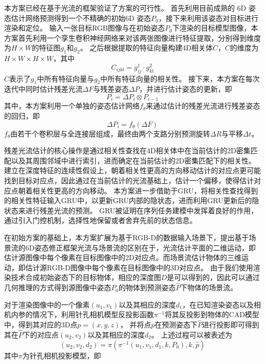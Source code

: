 \documentclass[12pt]{article}
\begin{document}
本方案已经在基于光流的框架验证了方案的可行性。
首先利用目前成熟的 6D 姿态估计网络预测得到一个不精确的初始6D 姿态$P_0$，接下来利用该姿态对目标进行渲染和定位。
输入一张目标RGB图像与在初始姿态$P_0$下渲染的目标模型图像，本方案首先利用一个孪生卷积神经网络来对该两张图像进行特征提取，分别得到维度为$H\times W$的特征图$g_1$和$g_2$。
之后根据提取的特征向量构建4D相关体$C$，$C$的维度为$H\times W \times H \times W$，其中
\begin{equation}
    C_{ijkl} = g^1_{ij} \cdot g^2_{kl}
\end{equation}
$C$表示了$g_1$中所有特征向量与$g_2$中所有特征向量的相关性。
接下来，本方案在每次迭代中同时估计残差光流$\Delta F$与残差姿态$\Delta P$，并进行估计姿态的更新，即
\begin{equation}
    P_i = \Delta P_i \otimes P_{i-1}
\end{equation}
其中，本方案利用一个单独的姿态估计网络$f_{\theta}$来通过估计的残差光流进行残差姿态的回归，即
\begin{equation}
    \Delta P_i = f_{\theta}(\Delta F)
\end{equation}
$f_\theta$由若干个卷积层与全连接层组成，最终由两个支路分别预测旋转$\Delta R$与平移$\Delta t$。


残差光流估计的核心操作是通过相关性查找在4D相关体中在当前估计的2D密集匹配以及其周围邻域中进行索引，进而确定在当前估计的2D密集匹配下的相关性。
建立在深度特征的连续性假设上，朝着相关性更高的方向移动估计的对应点更可能找到目标对应点，因此通过在当前估计的光流基础上，估计一个偏移，使得估计对应点朝着相关性更高的方向移动。
本方案进一步借助于GRU，将相关性查找得到的相关性特征输入GRU中，以更新GRU内部的隐状态，进而利用GRU更新后的隐状态来进行残差光流的预测。
GRU被证明在序列任务建模中发挥着良好的作用，通过引入门控机制，选择性地保留或者舍弃先前的状态信息。

在初始方案的基础上，本方案扩展为基于RGB-D的数据输入场景下，提出基于场景流的6D姿态修正框架光流与场景流的区别在于，光流估计平面的二维运动，即估计源图像中每个像素在目标图像中的2D对应点。而场景流估计物体的三维运动，即估计源RGB-D图像中每个像素在目标图像中的3D对应点。
由于我们使用渲染技术合成初始姿态下的目标物体，相应的深度图$D$是可以得到的，因此可以通过几何推理的方式得到源图像中姿态$P_0$的物体到预测姿态$\hat{P}$下物体的场景流。

对于渲染图像中的一个像素$(u_1,v_1)$以及其相应的深度$d_1$，在已知渲染姿态以及相机内参的情况下，利用针孔相机模型反投影函数$\pi^{-1}$将其反投影到物体的CAD模型中，得到其对应的3D点$p=(x,y,z)$，
并将点$p$在预测姿态下$\hat{P}$进行投影即可得到其在$\hat{P}$下的对应点$(u_2,v_2)$以及其相应的深度$d_2$。
上述过程可以被表述为
\begin{equation}
    (u_2,v_2,d_2) = \pi(\pi^{-1}(u_1, v_1,d_1, k,P_0), k, \hat{p})
\end{equation}
其中$\pi$为针孔相机投影模型，即
\end{document}
